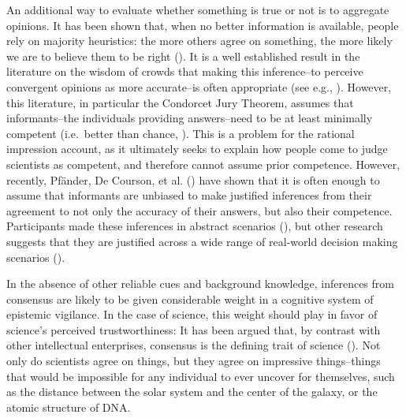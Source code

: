 \documentclass[
  jou,
  floatsintext,
  longtable,
  nolmodern,
  notxfonts,
  notimes,
  colorlinks=true,linkcolor=blue,citecolor=blue,urlcolor=blue]{apa7}
\begin{document}
An additional way to evaluate whether something is true or not is to
aggregate opinions. It has been shown that, when no better information
is available, people rely on majority heuristics: the more others agree
on something, the more likely we are to believe them to be right
(). It
is a well established result in the literature on the wisdom of crowds
that making this inference--to perceive convergent opinions as more
accurate--is often appropriate (see e.g.,
).
However, this literature, in particular the Condorcet Jury Theorem,
assumes that informants--the individuals providing answers--need to be
at least minimally competent (i.e.~better than chance,
). This is a problem for the rational impression account, as it
ultimately seeks to explain how people come to judge scientists as
competent, and therefore cannot assume prior competence. However,
recently, Pfänder, De Courson, et al.
() have shown that it is
often enough to assume that informants are unbiased to make justified
inferences from their agreement to not only the accuracy of their
answers, but also their competence. Participants made these inferences
in abstract scenarios (), but other research suggests that they are
justified across a wide range of real-world decision making scenarios
().

In the absence of other reliable cues and background knowledge,
inferences from consensus are likely to be given considerable weight in
a cognitive system of epistemic vigilance. In the case of science, this
weight should play in favor of science's perceived trustworthiness: It
has been argued that, by contrast with other intellectual enterprises,
consensus is the defining trait of science
().
Not only do scientists agree on things, but they agree on impressive
things--things that would be impossible for any individual to ever
uncover for themselves, such as the distance between the solar system
and the center of the galaxy, or the atomic structure of DNA.
\end{document}
